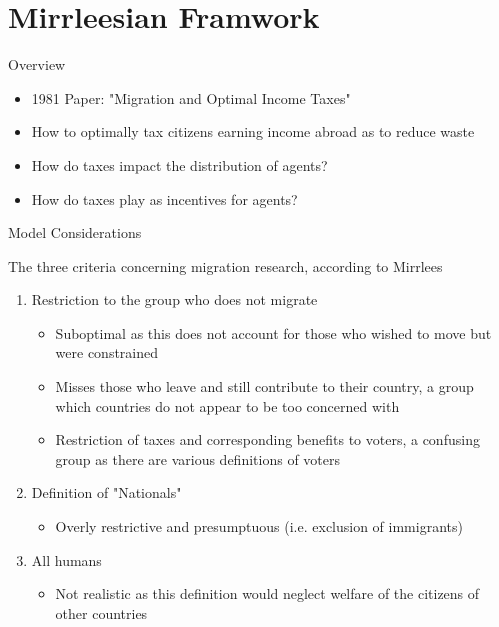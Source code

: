 \documentclass[aspectratio=169,professionalfonts]{beamer}
\begin{document}
\section{Mirrleesian Framwork}

\begin{frame}{Overview}
  \begin{itemize}
    \item 1981 Paper: "Migration and Optimal Income Taxes"
    \item How to optimally tax citizens earning income abroad as to reduce waste
    \item How do taxes impact the distribution of agents?
    \item How do taxes play as incentives for agents?
  \end{itemize}
\end{frame}

\begin{frame}{Model Considerations}
  \begin{tcolorbox}[colback=red!5!white,colframe=red!75!black]
    The three criteria concerning migration research, according to Mirrlees
  \end{tcolorbox}
  \begin{enumerate}
    \item Restriction to the group who does not migrate
    \begin{itemize}
      \item Suboptimal as this does not account for those who wished to move but were constrained
      \item Misses those who leave and still contribute to their country, a group which countries do not appear to be too concerned with
      \item Restriction of taxes and corresponding benefits to voters, a confusing group as there are various definitions of voters
    \end{itemize}
    \item Definition of "Nationals"
    \begin{itemize}
      \item Overly restrictive and presumptuous (i.e. exclusion of immigrants)
    \end{itemize}
    \item All humans
    \begin{itemize}
      \item Not realistic as this definition would neglect welfare of the citizens of other countries
    \end{itemize}
  \end{enumerate}
\end{frame}
\end{document}
